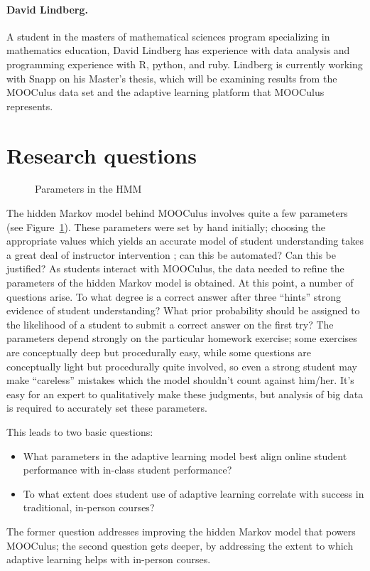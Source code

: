\documentclass[12pt]{article}
\begin{document}
\paragraph*{David Lindberg.} A student in the masters of mathematical
sciences program specializing in mathematics education, David Lindberg
has experience with data analysis and programming experience with R,
python, and ruby.  Lindberg is currently working with Snapp on his
Master's thesis, which will be examining results from the MOOCulus
data set and the adaptive learning platform that MOOCulus represents.

\section{Research questions}

\begin{figure}
  \vspace{2in}
  \caption{Parameters in the HMM}
  \label{fig:parameters}
\end{figure}

The hidden Markov model behind MOOCulus involves quite a few
parameters (see Figure~\ref{fig:parameters}).  These parameters were
set by hand initially; choosing the appropriate values which yields an
accurate model of student understanding takes a great deal of
instructor intervention \parencite{romero2010educational}; can this be
automated?  Can this be justified?  As students interact with
MOOCulus, the data needed to refine the parameters of the hidden
Markov model is obtained.  At this point, a number of questions
arise. To what degree is a correct answer after three ``hints'' strong
evidence of student understanding?  What prior probability should be
assigned to the likelihood of a student to submit a correct answer on
the first try?  The parameters depend strongly on the particular
homework exercise; some exercises are conceptually deep but
procedurally easy, while some questions are conceptually light but
procedurally quite involved, so even a strong student may make
``careless'' mistakes which the model shouldn't count against him/her.
It's easy for an expert to qualitatively make these judgments, but
analysis of big data is required to accurately set these parameters.

This leads to two basic questions:
\begin{itemize}
\item What parameters in the adaptive learning model best align online
  student performance with in-class student performance?
\item To what extent does student use of adaptive learning correlate
  with success in traditional, in-person courses?
\end{itemize}
The former question addresses improving the hidden Markov model that
powers MOOCulus; the second question gets deeper, by addressing the
extent to which adaptive learning helps with in-person courses.
\end{document}
